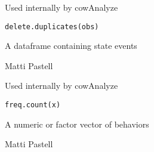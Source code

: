 \documentclass{book}
\begin{document}
\begin{Description}\relax
Used internally by cowAnalyze
\end{Description}
\begin{Usage}
\begin{verbatim}
delete.duplicates(obs)
\end{verbatim}
\end{Usage}
\begin{Arguments}
\begin{ldescription}
\item[\code{obs}] A dataframe containing state events
\end{ldescription}
\end{Arguments}
\begin{Author}\relax
Matti Pastell
\end{Author}

\begin{Description}\relax
Used internally by cowAnalyze
\end{Description}
\begin{Usage}
\begin{verbatim}
freq.count(x)
\end{verbatim}
\end{Usage}
\begin{Arguments}
\begin{ldescription}
\item[\code{x}] A numeric or factor vector of behaviors
\end{ldescription}
\end{Arguments}
\begin{Author}\relax
Matti Pastell
\end{Author}
\end{document}
